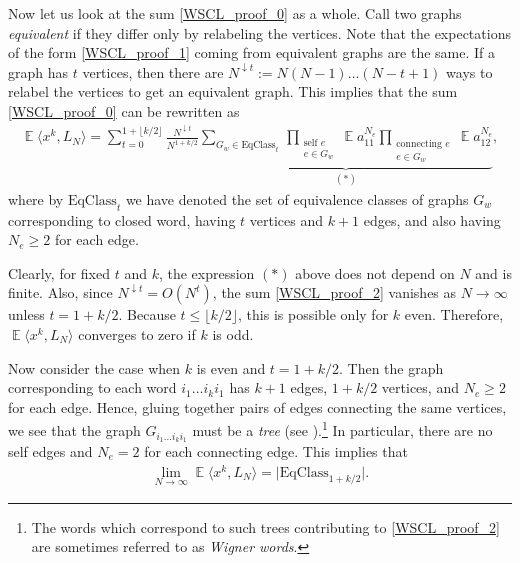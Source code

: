 \documentclass[letterpaper,11pt,oneside,reqno]{amsart}
\numberwithin{equation}{section}
\DeclareMathOperator{\EE}{\mathbb{E}}
\theoremstyle{definition}
\begin{document}
Now let us look at the sum \eqref{WSCL_proof_0} as a whole. 
Call two graphs
\emph{equivalent}
if they differ only by relabeling the vertices.
Note that the 
expectations 
of the form
\eqref{WSCL_proof_1}
coming from equivalent graphs are the same. If a graph has $t$ vertices, then there are 
$N^{\downarrow t}:=N(N-1)\ldots(N-t+1)$ ways to relabel the vertices 
to get an equivalent graph. This implies that the sum
\eqref{WSCL_proof_0} can be rewritten as
\begin{align}\label{WSCL_proof_2}
	\EE\langle x^k, L_N\rangle=\sum_{t=0}^{1+\lfloor k/2\rfloor}\frac{N^{\downarrow t}}{N^{1+k/2}}
	\underbrace{\sum_{G_w\in\text{EqClass}_t}\,
	\prod_{\substack{\text{self } e\\e\in G_{w}}}\EE a_{11}^{N_e}
	\prod_{\substack{\text{connecting } e\\ e\in G_{w}}}\EE a_{12}^{N_e}}_{(*)},
\end{align}
where by $\text{EqClass}_t$ we have denoted the set of equivalence classes
of graphs $G_w$ corresponding to closed word, having $t$ vertices and $k+1$ edges, and 
also having $N_e\ge2$ for each edge.

Clearly, for fixed $t$ and $k$, the expression $(*)$ above does not depend on $N$
and is finite. Also, since $N^{\downarrow t}=O(N^{t})$, 
the sum \eqref{WSCL_proof_2} vanishes as $N\to\infty$
unless $t=1+k/2$. Because $t\le \lfloor k/2\rfloor$, this is possible only
for $k$ even. Therefore,
$\EE\langle x^k, L_N\rangle$ converges to zero if $k$ is odd.

Now consider the case when $k$ is even and $t=1+k/2$. Then the graph corresponding to each word
$i_1 \ldots i_ki_1$ has $k+1$ edges, $1+k/2$ vertices, 
and $N_e\ge2$ for each edge. Hence, gluing together pairs of edges connecting 
the same vertices, we see that the graph 
$G_{i_1 \ldots i_ki_1}$ must be a \emph{tree} (see ).\footnote{The words which correspond to
such trees 
contributing to \eqref{WSCL_proof_2}
are sometimes referred to as \emph{Wigner words}.}
In particular, there are no self edges and $N_e=2$ for each connecting edge. This implies that 
\begin{align*}
	\lim_{N\to\infty}\EE\langle x^k, L_N\rangle=\big|\text{EqClass}_{1+k/2}\big|.
\end{align*}
\end{document}
